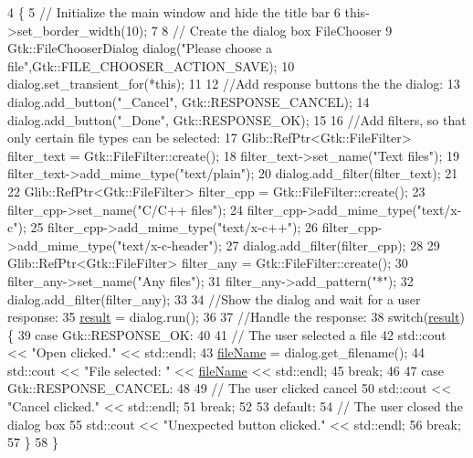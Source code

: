\begin{DoxyCode}
4                          \{
5     \textcolor{comment}{// Initialize the main window and hide the title bar}
6     this->set\_border\_width(10);
7 
8     \textcolor{comment}{// Create the dialog box FileChooser}
9     Gtk::FileChooserDialog dialog(\textcolor{stringliteral}{"Please choose a file"},Gtk::FILE\_CHOOSER\_ACTION\_SAVE);
10     dialog.set\_transient\_for(*\textcolor{keyword}{this});
11 
12     \textcolor{comment}{//Add response buttons the the dialog:}
13     dialog.add\_button(\textcolor{stringliteral}{"\_Cancel"}, Gtk::RESPONSE\_CANCEL);
14     dialog.add\_button(\textcolor{stringliteral}{"\_Done"}, Gtk::RESPONSE\_OK);
15 
16     \textcolor{comment}{//Add filters, so that only certain file types can be selected:}
17     Glib::RefPtr<Gtk::FileFilter> filter\_text = Gtk::FileFilter::create();
18     filter\_text->set\_name(\textcolor{stringliteral}{"Text files"});
19     filter\_text->add\_mime\_type(\textcolor{stringliteral}{"text/plain"});
20     dialog.add\_filter(filter\_text);
21 
22     Glib::RefPtr<Gtk::FileFilter> filter\_cpp = Gtk::FileFilter::create();
23     filter\_cpp->set\_name(\textcolor{stringliteral}{"C/C++ files"});
24     filter\_cpp->add\_mime\_type(\textcolor{stringliteral}{"text/x-c"});
25     filter\_cpp->add\_mime\_type(\textcolor{stringliteral}{"text/x-c++"});
26     filter\_cpp->add\_mime\_type(\textcolor{stringliteral}{"text/x-c-header"});
27     dialog.add\_filter(filter\_cpp);
28 
29     Glib::RefPtr<Gtk::FileFilter> filter\_any = Gtk::FileFilter::create();
30     filter\_any->set\_name(\textcolor{stringliteral}{"Any files"});
31     filter\_any->add\_pattern(\textcolor{stringliteral}{"*"});
32     dialog.add\_filter(filter\_any);
33 
34     \textcolor{comment}{//Show the dialog and wait for a user response:}
35     \hyperlink{class_file_chooser_a7651bd1362ed109c0ac323d8ab41b254}{result} = dialog.run();
36 
37     \textcolor{comment}{//Handle the response:}
38     \textcolor{keywordflow}{switch}(\hyperlink{class_file_chooser_a7651bd1362ed109c0ac323d8ab41b254}{result}) \{
39         \textcolor{keywordflow}{case} Gtk::RESPONSE\_OK:
40 
41             \textcolor{comment}{// The user selected a file}
42             std::cout << \textcolor{stringliteral}{"Open clicked."} << std::endl;
43             \hyperlink{class_file_chooser_a1d086cbbd2700e5fe9e143c505b205c8}{fileName} = dialog.get\_filename();
44             std::cout << \textcolor{stringliteral}{"File selected: "} <<  \hyperlink{class_file_chooser_a1d086cbbd2700e5fe9e143c505b205c8}{fileName} << std::endl;
45             \textcolor{keywordflow}{break};
46 
47         \textcolor{keywordflow}{case} Gtk::RESPONSE\_CANCEL:
48 
49             \textcolor{comment}{// The user clicked cancel}
50             std::cout << \textcolor{stringliteral}{"Cancel clicked."} << std::endl;
51             \textcolor{keywordflow}{break};
52 
53         \textcolor{keywordflow}{default}:
54             \textcolor{comment}{// The user closed the dialog box}
55             std::cout << \textcolor{stringliteral}{"Unexpected button clicked."} << std::endl;
56             \textcolor{keywordflow}{break};
57     \}
58 \}
\end{DoxyCode}
